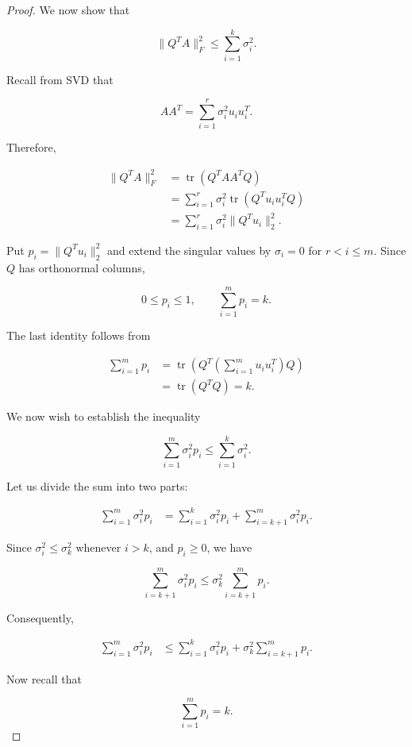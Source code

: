 \documentclass[11pt]{article}
\begin{document}
\begin{proof}
We now show that

\[
\boxed{
\|Q^TA\|_F^2\leq
\sum_{i=1}^{k}\sigma_i^2.
}
\]

Recall from SVD that

\[
AA^T=\sum_{i=1}^{r}\sigma_i^2u_i u_i^T.
\]

Therefore,

\[
\begin{aligned}
\|Q^TA\|_F^2
&=\operatorname{tr}(Q^TAA^TQ)\\
&=\sum_{i=1}^{r}\sigma_i^2
\operatorname{tr}(Q^Tu_i u_i^TQ)\\
&=\sum_{i=1}^{r}\sigma_i^2\|Q^Tu_i\|_2^2.
\end{aligned}
\]

Put $p_i=\|Q^Tu_i\|_2^2$ and extend
the singular values by $\sigma_i=0$
for $r<i\leq m$. Since $Q$ has
orthonormal columns,

\[
0\leq p_i\leq 1,
\qquad
\sum_{i=1}^{m}p_i=k.
\]

The last identity follows from

\[
\begin{aligned}
\sum_{i=1}^{m}p_i
&=\operatorname{tr}\left(
Q^T\left(\sum_{i=1}^{m}u_i u_i^T\right)Q
\right)\\
&=\operatorname{tr}(Q^TQ)=k.
\end{aligned}
\]




We now wish to establish the inequality

\[
\sum_{i=1}^{m}\sigma_i^2p_i
\leq
\sum_{i=1}^{k}\sigma_i^2.
\]



Let us divide the sum into two parts:

\[
\begin{aligned}
\sum_{i=1}^{m}\sigma_i^2p_i
&=
\sum_{i=1}^{k}\sigma_i^2p_i
+
\sum_{i=k+1}^{m}\sigma_i^2p_i.
\end{aligned}
\]

Since $\sigma_i^2\leq\sigma_k^2$
whenever $i>k$, and $p_i\geq 0$,
we have

\[
\sum_{i=k+1}^{m}\sigma_i^2p_i
\leq
\sigma_k^2\sum_{i=k+1}^{m}p_i.
\]

Consequently,

\[
\begin{aligned}
\sum_{i=1}^{m}\sigma_i^2p_i
&\leq
\sum_{i=1}^{k}\sigma_i^2p_i
+
\sigma_k^2\sum_{i=k+1}^{m}p_i.
\end{aligned}
\]

Now recall that

\[
\sum_{i=1}^{m}p_i=k.
\]


\end{proof}
\end{document}
